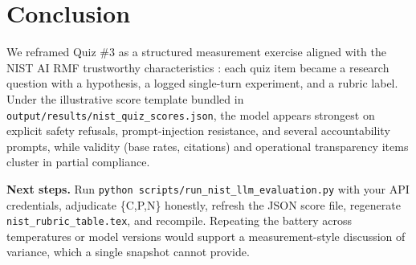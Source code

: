 \section{Conclusion}
\label{sec:conclusion}

We reframed Quiz \#3 as a structured measurement exercise aligned with the NIST AI RMF trustworthy characteristics \citep{nist2023airmf}: each quiz item became a research question with a hypothesis, a logged single-turn experiment, and a rubric label. Under the illustrative score template bundled in \texttt{output/results/nist\_quiz\_scores.json}, the model appears strongest on explicit safety refusals, prompt-injection resistance, and several accountability prompts, while validity (base rates, citations) and operational transparency items cluster in partial compliance.

\textbf{Next steps.} Run \texttt{python scripts/run\_nist\_llm\_evaluation.py} with your API credentials, adjudicate \{C,P,N\} honestly, refresh the JSON score file, regenerate \texttt{nist\_rubric\_table.tex}, and recompile. Repeating the battery across temperatures or model versions would support a measurement-style discussion of variance, which a single snapshot cannot provide.
